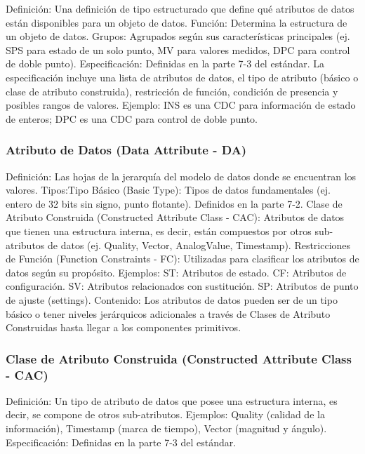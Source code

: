 \documentclass[a5paper]{book}%
\begin{document}
    Definición: Una definición de tipo estructurado que define qué atributos de datos están disponibles para un objeto de datos.
    Función: Determina la estructura de un objeto de datos.
    Grupos: Agrupados según sus características principales (ej. SPS para estado de un solo punto, MV para valores medidos, DPC para control de doble punto).
    Especificación: Definidas en la parte 7-3 del estándar. La especificación incluye una lista de atributos de datos, el tipo de atributo (básico o clase de atributo construida), restricción de función, condición de presencia y posibles rangos de valores.
    Ejemplo: INS es una CDC para información de estado de enteros; DPC es una CDC para control de doble punto.

\subsubsection{Atributo de Datos (Data Attribute - DA)}

    Definición: Las hojas de la jerarquía del modelo de datos donde se encuentran los valores.
    Tipos:Tipo Básico (Basic Type): Tipos de datos fundamentales (ej. entero de 32 bits sin signo, punto flotante). Definidos en la parte 7-2.
    Clase de Atributo Construida (Constructed Attribute Class - CAC): Atributos de datos que tienen una estructura interna, es decir, están compuestos por otros sub-atributos de datos (ej. Quality, Vector, AnalogValue, Timestamp).
    Restricciones de Función (Function Constraints - FC): Utilizadas para clasificar los atributos de datos según su propósito. Ejemplos:
    ST: Atributos de estado.
    CF: Atributos de configuración.
    SV: Atributos relacionados con sustitución.
    SP: Atributos de punto de ajuste (settings).
    Contenido: Los atributos de datos pueden ser de un tipo básico o tener niveles jerárquicos adicionales a través de Clases de Atributo Construidas hasta llegar a los componentes primitivos.

    \subsubsection{Clase de Atributo Construida (Constructed Attribute Class - CAC)}
    

    Definición: Un tipo de atributo de datos que posee una estructura interna, es decir, se compone de otros sub-atributos.
    Ejemplos: Quality (calidad de la información), Timestamp (marca de tiempo), Vector (magnitud y ángulo).
    Especificación: Definidas en la parte 7-3 del estándar.
\end{document}
